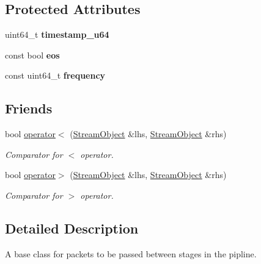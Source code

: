 \subsection*{Protected Attributes}
\begin{DoxyCompactItemize}
\item 
uint64\+\_\+t {\bfseries timestamp\+\_\+u64}\hypertarget{class_stream_object_af1299949f070b50e95a371b3df9e9f7e}{}\label{class_stream_object_af1299949f070b50e95a371b3df9e9f7e}

\item 
const bool {\bfseries eos}\hypertarget{class_stream_object_a7baf4e4906ac06af2d1d34e737002f4d}{}\label{class_stream_object_a7baf4e4906ac06af2d1d34e737002f4d}

\item 
const uint64\+\_\+t {\bfseries frequency}\hypertarget{class_stream_object_a75f08a5e2c0ebc958c68fc19775a3fc8}{}\label{class_stream_object_a75f08a5e2c0ebc958c68fc19775a3fc8}

\end{DoxyCompactItemize}
\subsection*{Friends}
\begin{DoxyCompactItemize}
\item 
bool \hyperlink{class_stream_object_a7cb06d62e412a38f2533eccc546bf83b}{operator$<$} (\hyperlink{class_stream_object}{Stream\+Object} \&lhs, \hyperlink{class_stream_object}{Stream\+Object} \&rhs)
\begin{DoxyCompactList}\small\item\em Comparator for $<$ operator. \end{DoxyCompactList}\item 
bool \hyperlink{class_stream_object_affe1fe497560f00167bdfe01675d3e09}{operator$>$} (\hyperlink{class_stream_object}{Stream\+Object} \&lhs, \hyperlink{class_stream_object}{Stream\+Object} \&rhs)
\begin{DoxyCompactList}\small\item\em Comparator for $>$ operator. \end{DoxyCompactList}\end{DoxyCompactItemize}


\subsection{Detailed Description}
A base class for packets to be passed between stages in the pipline. 

